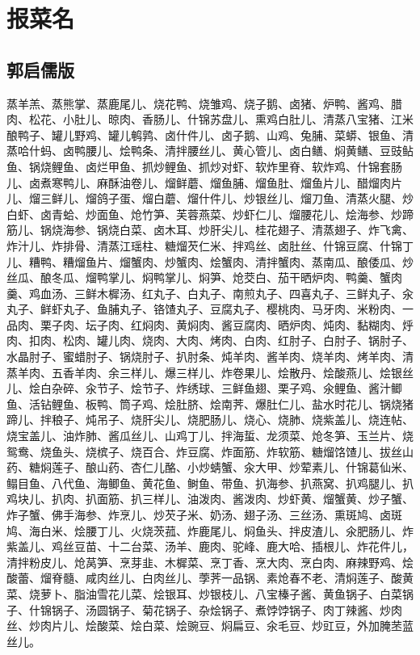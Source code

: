 \chapter{报菜名}

\section{郭启儒版}
蒸羊羔、蒸熊掌、蒸鹿尾儿、烧花鸭、烧雏鸡、烧子鹅、卤猪、炉鸭、酱鸡、腊肉、松花、小肚儿、晾肉、香肠儿、什锦苏盘儿、熏鸡白肚儿、清蒸八宝猪、江米酿鸭子、罐儿野鸡、罐儿鹌鹑、卤什件儿、卤子鹅、山鸡、兔脯、菜蟒、银鱼、清蒸哈什蚂、卤鸭腰儿、烩鸭条、清拌腰丝儿、黄心管儿、卤白鳝、焖黄鳝、豆豉鲇鱼、锅烧鲤鱼、卤烂甲鱼、抓炒鲤鱼、抓炒对虾、软炸里脊、软炸鸡、什锦套肠儿、卤煮寒鸭儿、麻酥油卷儿、熘鲜蘑、熘鱼脯、熘鱼肚、熘鱼片儿、醋熘肉片儿、熘三鲜儿、熘鸽子蛋、熘白蘑、熘什件儿、炒银丝儿、熘刀鱼、清蒸火腿、炒白虾、卤青蛤、炒面鱼、炝竹笋、芙蓉燕菜、炒虾仁儿、熘腰花儿、烩海参、炒蹄筋儿、锅烧海参、锅烧白菜、卤木耳、炒肝尖儿、桂花翅子、清蒸翅子、炸飞禽、炸汁儿、炸排骨、清蒸江瑶柱、糖熘芡仁米、拌鸡丝、卤肚丝、什锦豆腐、什锦丁儿、糟鸭、糟熘鱼片、熘蟹肉、炒蟹肉、烩蟹肉、清拌蟹肉、蒸南瓜、酿倭瓜、炒丝瓜、酿冬瓜、熘鸭掌儿、焖鸭掌儿、焖笋、炝茭白、茄干晒炉肉、鸭羹、蟹肉羹、鸡血汤、三鲜木樨汤、红丸子、白丸子、南煎丸子、四喜丸子、三鲜丸子、汆丸子、鲜虾丸子、鱼脯丸子、铬馇丸子、豆腐丸子、樱桃肉、马牙肉、米粉肉、一品肉、栗子肉、坛子肉、红焖肉、黄焖肉、酱豆腐肉、晒炉肉、炖肉、黏糊肉、烀肉、扣肉、松肉、罐儿肉、烧肉、大肉、烤肉、白肉、红肘子、白肘子、锅肘子、水晶肘子、蜜蜡肘子、锅烧肘子、扒肘条、炖羊肉、酱羊肉、烧羊肉、烤羊肉、清蒸羊肉、五香羊肉、余三样儿、爆三样儿、炸卷果儿、烩散丹、烩酸燕儿、烩银丝儿、烩白杂碎、汆节子、烩节子、炸绣球、三鲜鱼翅、栗子鸡、氽鲤鱼、酱汁鲫鱼、活钻鲤鱼、板鸭、筒子鸡、烩肚脐、烩南荠、爆肚仁儿、盐水时花儿、锅烧猪蹄儿、拌稂子、炖吊子、烧肝尖儿、烧肥肠儿、烧心、烧肺、烧紫盖儿、烧连帖、烧宝盖儿、油炸肺、酱瓜丝儿、山鸡丁儿、拌海蜇、龙须菜、炝冬笋、玉兰片、烧鸳鸯、烧鱼头、烧槟子、烧百合、炸豆腐、炸面筋、炸软筋、糖熘饹馇儿、拔丝山药、糖焖莲子、酿山药、杏仁儿酪、小炒蜻蟹、汆大甲、炒荤素儿、什锦葛仙米、鳎目鱼、八代鱼、海鲫鱼、黄花鱼、鲥鱼、带鱼、扒海参、扒燕窝、扒鸡腿儿、扒鸡块儿、扒肉、扒面筋、扒三样儿、油泼肉、酱泼肉、炒虾黄、熘蟹黄、炒子蟹、炸子蟹、佛手海参、炸烹儿、炒芡子米、奶汤、翅子汤、三丝汤、熏斑鸠、卤斑鸠、海白米、烩腰丁儿、火烧茨菰、炸鹿尾儿、焖鱼头、拌皮渣儿、氽肥肠儿、炸紫盖儿、鸡丝豆苗、十二台菜、汤羊、鹿肉、驼峰、鹿大哈、插根儿、炸花件儿，清拌粉皮儿、炝莴笋、烹芽韭、木樨菜、烹丁香、烹大肉、烹白肉、麻辣野鸡、烩酸蕾、熘脊髓、咸肉丝儿、白肉丝儿、荸荠一品锅、素炝春不老、清焖莲子、酸黄菜、烧萝卜、脂油雪花儿菜、烩银耳、炒银枝儿、八宝榛子酱、黄鱼锅子、白菜锅子、什锦锅子、汤圆锅子、菊花锅子、杂烩锅子、煮饽饽锅子、肉丁辣酱、炒肉丝、炒肉片儿、烩酸菜、烩白菜、烩豌豆、焖扁豆、氽毛豆、炒豇豆，外加腌苤蓝丝儿。

